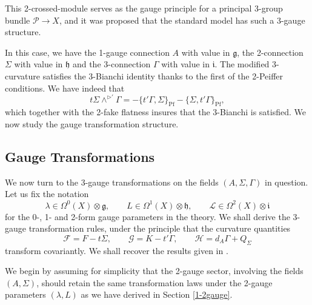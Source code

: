 \documentclass[onecolumn]{article}
\theoremstyle{theorem}
\theoremstyle{remark}
\theoremstyle{example}
\theoremstyle{definition}
\numberwithin{equation}{section}
\def\g{\mathfrak g}
\def\h{\mathfrak h}
\begin{document}
{This} %
 2-crossed-module  serves as the gauge principle for a principal 3-group bundle $\mathscr{P}\rightarrow X$, and it was proposed \cite{Radenkovic:2019qme} that the standard model has such a 3-gauge structure. 

In this case, we have the 1-gauge connection $A$ with value in $\g$, the 2-connection $\Sigma$ with value in $\h$ and the 3-connection $\Gamma$ with value in $\mathfrak{i}$. The modified 3-curvature satisfies the 3-Bianchi identity thanks to the  first of the 2-Peiffer conditions. We have indeed that 
\begin{equation}
    t\Sigma\wedge^{\rhd'}\Gamma = -\{t'\Gamma,\Sigma\}_\text{Pf} - \{\Sigma,t'\Gamma\}_\text{Pf} \nonumber,
\end{equation}
which together with the 2-fake flatness insures that the 3-Bianchi is satisfied. We now study the gauge transformation structure. 


\subsection{Gauge Transformations}\label{1-2-3gau}
We now turn to the 3-gauge transformations on the fields $(A,\Sigma,\Gamma)$ in question. Let us fix the notation 
\begin{equation}
    \lambda\in\Omega^0(X)\otimes\g,\qquad L\in\Omega^1(X)\otimes \h,\qquad \mathcal{L}\in\Omega^2(X)\otimes \mathfrak{i}\nonumber
\end{equation}
for the 0-, 1- and 2-form gauge parameters in the theory. We shall derive the 3-gauge transformation rules, under the principle that the curvature quantities
\begin{equation}
    \mathcal{F} = F - t\Sigma,\qquad \mathcal{G} = K - t'\Gamma,\qquad \mathcal{H} = d_A\Gamma+Q_\Sigma\nonumber
\end{equation}
transform covariantly. We shall recover the results given in \cite{Radenkovic:2021fqq}.


We begin by assuming for simplicity that the 2-gauge sector, involving the fields $(A,\Sigma)$, should retain the same transformation laws under the 2-gauge parameters $(\lambda,L)$ as we have derived in Section \ref{1-2gauge}.
\end{document}
